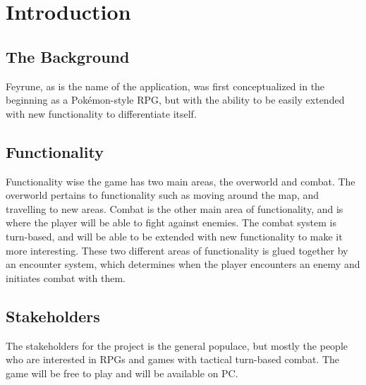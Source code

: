 \section{Introduction}

\begin{comment}
Give some background and explain the purpose of this application. Describe
the functionality of the application. Describe the stakeholders of the project,
highlight who will benefit from/use this particular application.
\end{comment}
\subsection{The Background}
Feyrune, as is the name of the application, was first conceptualized in the beginning as a Pokémon-style RPG, but with the ability to be easily extended with new functionality to differentiate itself.

\subsection{Functionality}
Functionality wise the game has two main areas, the overworld and combat. The overworld pertains to functionality such as moving around the map, and travelling to new areas. Combat is the other main area of functionality, and is where the player will be able to fight against enemies. The combat system is turn-based, and will be able to be extended with new functionality to make it more interesting. These two different areas of functionality is glued together by an encounter system, which determines when the player encounters an enemy and initiates combat with them.

\subsection{Stakeholders}
The stakeholders for the project is the general populace, but mostly the people who are interested in RPGs and games with tactical turn-based combat. The game will be free to play and will be available on PC.



